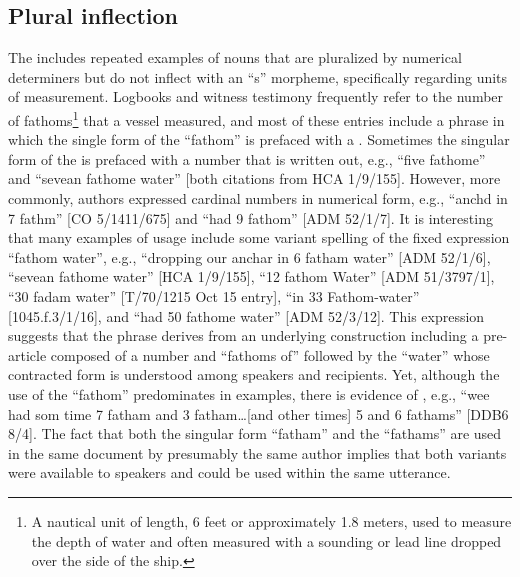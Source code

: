 \subsection{{Plural inflection}}\label{sec:5.2.3}

The  includes repeated examples of nouns that are pluralized by numerical determiners but do not inflect with an “s” morpheme, specifically regarding units of measurement. Logbooks and witness testimony frequently refer to the number of fathoms\footnote{A nautical unit of length, 6 feet or approximately 1.8 meters, used to measure the depth of water and often measured with a sounding or lead line dropped over the side of the ship.} that a vessel measured, and most of these entries include a phrase in which the single form of the  “fathom” is prefaced with a . Sometimes the singular form of the  is prefaced with a number that is written out, e.g., “five fathome” and “sevean fathome water” [both citations from HCA 1/9/155]. However, more commonly, authors expressed cardinal numbers in numerical form, e.g., “anchd in 7 fathm” [CO 5/1411/675] and “had 9 fathom” [ADM 52/1/7]. It is interesting that many examples of usage include some variant spelling of the fixed expression “fathom water”, e.g., “dropping our anchar in 6 fatham water” [ADM 52/1/6], “sevean fathome water” [HCA 1/9/155], “12 fathom Water” [ADM 51/3797/1], “30 fadam water” [T/70/1215 Oct 15 entry], “in 33 Fathom-water” [1045.f.3/1/16], and “had 50 fathome water” [ADM 52/3/12]. This expression suggests that the phrase derives from an underlying construction including a pre-article composed of a number and “fathoms of” followed by the  “water” whose contracted form is understood among speakers and recipients. Yet, although the use of the   “fathom” predominates in  examples, there is evidence of , e.g., “wee had som time 7 fatham and 3 fatham…[and other times] 5 and 6 fathams” [DDB6 8/4]. The fact that both the singular form “fatham” and the  “fathams” are used in the same document by presumably the same author implies that both variants were available to speakers and could be used within the same utterance. 


